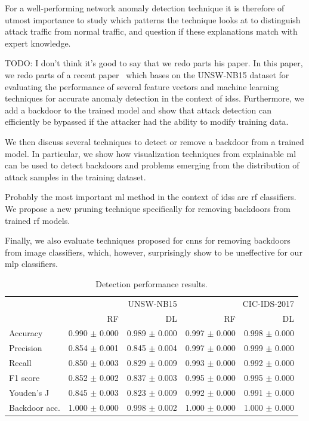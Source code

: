 \documentclass[10pt,sigconf,letterpaper,dvipsnames]{acmart}
\newcommand\note[2]{{\color{#1}#2}}
\newcommand\todo[1]{{\note{red}{TODO: #1}}}
\begin{document}
For a well-performing network anomaly detection technique it is therefore of utmost importance to study which patterns the technique looks at to distinguish attack traffic from normal traffic, and question if these explanations match with expert knowledge.

\todo{I don't think it's good to say that we redo parts his paper.}
In this paper, we redo parts of a recent paper~\cite{meghdouri_analysis_2018} which bases on the UNSW-NB15 dataset \cite{moustafa_unsw-nb15:_2015} for evaluating the performance of several feature vectors and machine learning techniques for accurate anomaly detection in the context of \glspl{ids}.
Furthermore, we add a backdoor to the trained model and show that attack detection can efficiently be bypassed if the attacker had the ability to modify training data.

We then discuss several techniques to detect or remove a backdoor from a trained model. In particular, we show how visualization techniques from explainable \gls{ml} can be used to detect backdoors and problems emerging from the distribution of attack samples in the training dataset.

Probably the most important \gls{ml} method in the context of \glspl{ids} are \gls{rf} classifiers. We propose a new pruning technique specifically for removing backdoors from trained \gls{rf} models.

Finally, we also evaluate techniques proposed for \glspl{cnn} for removing backdoors from image classifiers, which, however, surprisingly show to be uneffective for our \gls{mlp} classifiers. 


\begin{table}[h]
\caption{Detection performance results.} \label{tab:performance_results}
\begin{tabular}{l r r r r} \toprule
& \multicolumn{2}{r}{UNSW-NB15} & \multicolumn{2}{r}{CIC-IDS-2017} \\
& RF & DL & RF & DL \\ \midrule
Accuracy	& 0.990 $\pm$ 0.000	& 0.989 $\pm$ 0.000	& 0.997 $\pm$ 0.000	& 0.998 $\pm$ 0.000	\\
Precision	& 0.854 $\pm$ 0.001	& 0.845 $\pm$ 0.004	& 0.997 $\pm$ 0.000	& 0.999 $\pm$ 0.000	\\
Recall	& 0.850 $\pm$ 0.003	& 0.829 $\pm$ 0.009	& 0.993 $\pm$ 0.000	& 0.992 $\pm$ 0.000	\\
F1 score	& 0.852 $\pm$ 0.002	& 0.837 $\pm$ 0.003	& 0.995 $\pm$ 0.000	& 0.995 $\pm$ 0.000	\\
Youden's J	& 0.845 $\pm$ 0.003	& 0.823 $\pm$ 0.009	& 0.992 $\pm$ 0.000	& 0.991 $\pm$ 0.000	\\
Backdoor acc.	& 1.000 $\pm$ 0.000	& 0.998 $\pm$ 0.002	& 1.000 $\pm$ 0.000	& 1.000 $\pm$ 0.000	\\


\bottomrule
\end{tabular}
\end{table}
\end{document}
